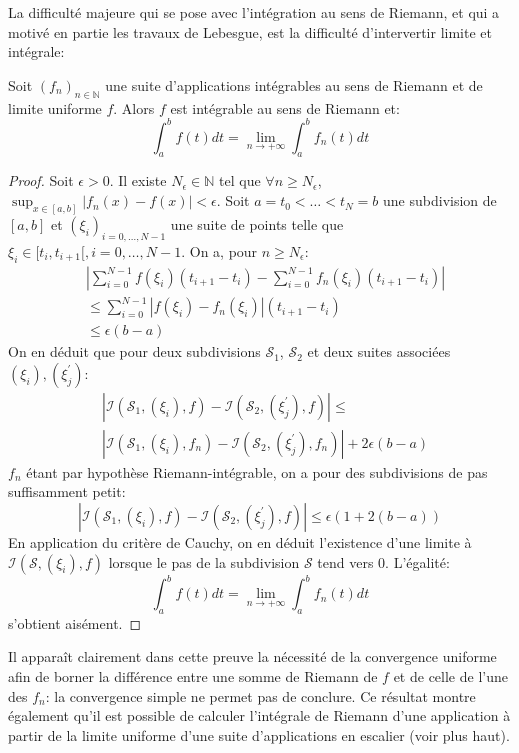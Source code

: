 La difficulté majeure qui se pose avec l'intégration au sens de Riemann, et qui
a motivé en partie les travaux de Lebesgue, est la difficulté d'intervertir
limite et intégrale:
\begin{prop}
Soit $(f_n)_{n \in \mathbb{N}}$ une suite d'applications intégrables au sens de
Riemann et de limite uniforme $f$. Alors $f$ est intégrable au sens de Riemann
et:
\[
\int_a^b f(t) dt = \lim_{n \to +\infty} \int_a^b f_n(t)dt
\]
\end{prop}
\begin{proof}
Soit $\epsilon > 0$. Il existe $N_\epsilon \in \mathbb{N}$ tel que $\forall n
\geq  N_\epsilon$, $\sup_{x\in[a,b]} \left|f_n(x)-f(x)\right|<\epsilon$. Soit
$a=t_0<\dots<t_N=b$ une subdivision de $[a,b]$ et $(\xi_i)_{i=0,\dots, N-1}$ une
suite de points telle que $\xi_i \in [t_i,t_{i+1}[,i=0,\dots,N-1$. On a, pour
$n \geq N_\epsilon$:
\begin{align*}
& \left|\sum_{i=0}^{N-1}f(\xi_i)(t_{i+1}-t_i) -
\sum_{i=0}^{N-1}f_n(\xi_i)(t_{i+1}-t_i)\right|\\
& \leq
\sum_{i=0}^{N-1}\left|f(\xi_i)-f_n(\xi_i)\right|(t_{i+1}-t_i) \\
& \leq \epsilon(b-a)
\end{align*}
On en déduit que pour deux subdivisions $\mathcal{S}_1$, $\mathcal{S}_2$ et
deux suites associées $(\xi_i), (\xi_j^\prime)$:
\begin{align*}
& |\mathcal{I}(\mathcal{S}_1, (\xi_i), f) -\mathcal{I}(\mathcal{S}_2,
 (\xi^\prime_j), f) | \leq \\
 & |\mathcal{I}(\mathcal{S}_1, (\xi_i), f_n)
 -\mathcal{I}(\mathcal{S}_2, (\xi^\prime_j), f_n) | + 2 \epsilon (b-a)
\end{align*}
$f_n$ étant par hypothèse Riemann-intégrable, on a pour des subdivisions de
pas suffisamment petit:
\[
|\mathcal{I}(\mathcal{S}_1, (\xi_i), f) -\mathcal{I}(\mathcal{S}_2,
 (\xi^\prime_j), f) | \leq \epsilon(1 + 2 (b-a))
\]
En application du critère de Cauchy, on en déduit l'existence d'une limite à
$\mathcal{I}(\mathcal{S}, (\xi_i), f)$ lorsque le pas de la subdivision
$\mathcal{S}$ tend vers 0. L'égalité:
\[
\int_a^b f(t)dt = \lim_{n \to +\infty} \int_a^b f_n(t)dt
\]
s'obtient aisément.
\end{proof}
Il apparaît clairement dans cette preuve la nécessité de la convergence uniforme
afin de borner la différence entre une somme de Riemann de $f$ et de celle
de l'une des $f_n$: la convergence simple ne permet pas de conclure. 
Ce résultat montre également qu'il est possible de calculer l'intégrale de
Riemann d'une application à partir de la limite uniforme d'une suite
d'applications en escalier (voir plus haut). 

